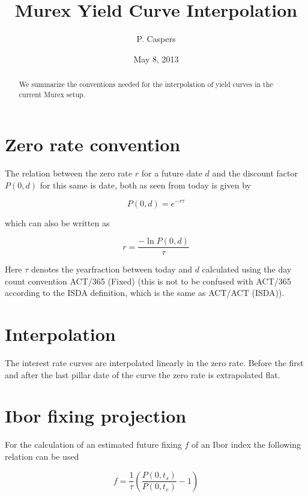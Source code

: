 \documentclass{amsart}
\theoremstyle{plain}
\numberwithin{equation}{section}
\begin{document}
\title[Murex Yield Curve Interpolation]{Murex Yield Curve Interpolation}
\author{P. Caspers}
\email[]{}
\date{May 8, 2013}
\begin{abstract}
We summarize the conventions needed for the interpolation of yield curves in the current Murex setup.
\end{abstract}

\maketitle


\section{Zero rate convention}
The relation between the zero rate $r$ for a future date $d$ and the discount factor $P(0,d)$ for this same is date, both as seen from today is given by

\begin{equation}
P(0,d) = e^{-r \tau}
\end{equation}

which can also be written as

\begin{equation}
r = \frac{-\ln P(0,d)}{\tau}
\end{equation}

Here $\tau$ denotes the yearfraction between today and $d$ calculated using the day count convention ACT/365 (Fixed) (this is not to be confused
with ACT/365 according to the ISDA definition, which is the same as ACT/ACT (ISDA)).

\section{Interpolation}
The interest rate curves are interpolated linearly in the zero rate. Before the first and after the last pillar date of the curve the zero rate is extrapolated
flat.

\section{Ibor fixing projection}

For the calculation of an estimated future fixing $f$ of an Ibor index the following relation can be used

\begin{equation}
f = \frac{1}{\tau} \left( \frac{P(0,t_s)}{P(0,t_e)}-1 \right)
\end{equation}
\end{document}
